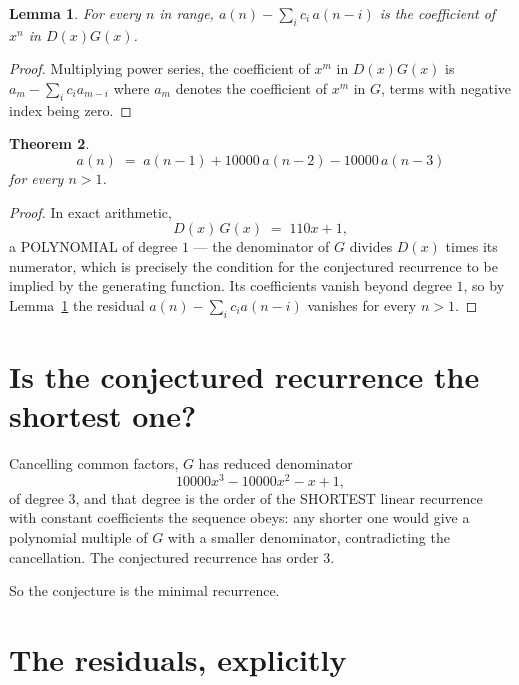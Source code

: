 \documentclass[11pt,a4paper]{article}
\theoremstyle{plain}
\newtheorem{theorem}{Theorem}
\newtheorem{lemma}[theorem]{Lemma}
\theoremstyle{definition}
\begin{document}
\begin{lemma}\label{lem:key}
For every $n$ in range, $a(n)-\sum_i c_i\,a(n-i)$ is the coefficient of $x^{n}$ in
$D(x)G(x)$.
\end{lemma}

\begin{proof}
Multiplying power series, the coefficient of $x^{m}$ in $D(x)G(x)$ is
$a_m-\sum_i c_i a_{m-i}$ where $a_m$ denotes the coefficient of $x^{m}$ in $G$, terms with
negative index being zero.
\end{proof}

\begin{theorem}
\[
a(n)\;=\;a(n-1) + 10000\,a(n-2) - 10000\,a(n-3)
\]
for every $n>1$.
\end{theorem}

\begin{proof}
In exact arithmetic,
\[
D(x)\,G(x)\;=\;110 x + 1,
\]
a POLYNOMIAL of degree $1$ --- the denominator of $G$ divides $D(x)$ times its numerator,
which is precisely the condition for the conjectured recurrence to be implied by the
generating function. Its coefficients vanish beyond degree $1$, so by
Lemma~\ref{lem:key} the residual $a(n)-\sum_ic_ia(n-i)$ vanishes for every
$n>1$.
\end{proof}

\section{Is the conjectured recurrence the shortest one?}

Cancelling common factors, $G$ has reduced denominator
\[
10000 x^{3} - 10000 x^{2} - x + 1,
\]
of degree $3$, and that degree is the order of the SHORTEST linear recurrence with
constant coefficients the sequence obeys: any shorter one would give a polynomial multiple of
$G$ with a smaller denominator, contradicting the cancellation. The conjectured recurrence has
order $3$.

So the conjecture is the minimal recurrence.

\section{The residuals, explicitly}
\end{document}

